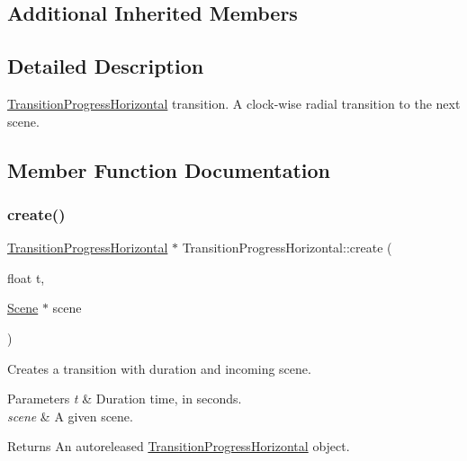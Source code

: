 \subsection*{Additional Inherited Members}


\subsection{Detailed Description}
\hyperlink{classTransitionProgressHorizontal}{Transition\+Progress\+Horizontal} transition. A clock-\/wise radial transition to the next scene. 

\subsection{Member Function Documentation}
\mbox{\label{classTransitionProgressHorizontal_a85609ebd5932061eb93ee0896146ddb4}} 
\subsubsection{\texorpdfstring{create()}{create()}\hspace{0.1cm}{\footnotesize\ttfamily [1/2]}}
{\footnotesize\ttfamily \hyperlink{classTransitionProgressHorizontal}{Transition\+Progress\+Horizontal} $\ast$ Transition\+Progress\+Horizontal\+::create (\begin{DoxyParamCaption}\item[{float}]{t,  }\item[{\hyperlink{classScene}{Scene} $\ast$}]{scene }\end{DoxyParamCaption})\hspace{0.3cm}{\ttfamily [static]}}

Creates a transition with duration and incoming scene.


\begin{DoxyParams}{Parameters}
{\em t} & Duration time, in seconds. \\
\hline
{\em scene} & A given scene. \\
\hline
\end{DoxyParams}
\begin{DoxyReturn}{Returns}
An autoreleased \hyperlink{classTransitionProgressHorizontal}{Transition\+Progress\+Horizontal} object. 
\end{DoxyReturn}
\mbox{\label{classTransitionProgressHorizontal_ab871b164a33ba2e7765575634a0585ed}} 
